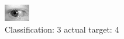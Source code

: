 \begin{figure}[h!]
\begin{center}
\includegraphics[width=0.60\columnwidth]{figures/ID699_class_3_target_4.png}
\end{center}
\caption{ Classification: 3 actual target: 4}
\label{fig:ID699_class_3_target_4}
\end{figure}
